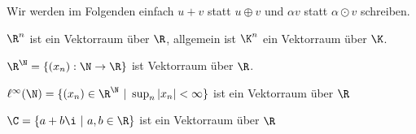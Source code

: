\documentclass[letterpaper,10pt,english]{jupyterBook}
\begin{document}
Wir werden im Folgenden einfach \(u +v\) statt \(u \oplus v\) und \(\alpha v\) statt \(\alpha \odot v\) schreiben.
\label{vektorraeume/vektorraeume:example-1}
\begin{example}{}{}



\(\R^n\) ist ein Vektorraum über \(\R\), allgemein ist \(\K^n\) ein Vektorraum über \(\K\).
\end{example}
\label{vektorraeume/vektorraeume:example-2}
\begin{example}{}{}



\(\R^\N =  \{(x_n):\N \rightarrow \R\}\) ist Vektorraum über \(\R\).
\end{example}
\label{vektorraeume/vektorraeume:example-3}
\begin{example}{}{}



\(\ell^\infty(\N) = \{(x_n) \in \R^\N~|~\sup_n |x_n| < \infty\}\) ist ein Vektorraum über \(\R\)
\end{example}
\label{vektorraeume/vektorraeume:example-4}
\begin{example}{}{}



\(\C = \{ a + b \i ~|~ a,b \in \R\}\) ist ein Vektorraum über \(\R\)
\end{example}
\end{document}
